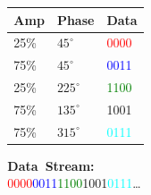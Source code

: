 \documentclass[]{beamer}
\begin{document}
\begin{frame}
\begin{columns}[T]
\begin{column}[T]{5cm}
        \end{column}
        \begin{column}[T]{5cm}
            \begin{table}[]
                \begin{tabular}{lll}
                    Amp  & Phase & Data \\
                    \hline
                    25\% & $45^{\circ}$  & \textcolor{red}{0000} \\
                    75\% & $45^{\circ}$  & \textcolor{blue}{0011} \\
                    25\% & $225^{\circ}$ & \textcolor{green}{1100} \\
                    75\% & $135^{\circ}$ & \textcolor{cyan!50}{1001} \\
                    75\% & $315^{\circ}$ & \textcolor{cyan}{0111} \\
                \end{tabular}
            \end{table}
            \textbf{Data~Stream:}\\\textcolor{red}{0000}\textcolor{blue}{0011}\textcolor{green}{1100}\textcolor{cyan!50}{1001}\textcolor{cyan}{0111}\dots
        \end{column}
    \end{columns}
\end{frame}
\end{document}
